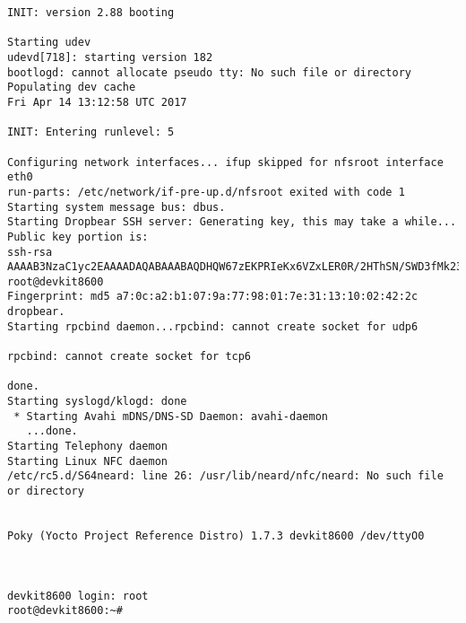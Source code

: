 \documentclass[a4paper,12pt]{report}
\begin{document}
\begin{lstlisting}[caption=Messages de sortie du terminal entre l'allumage de la cible et le prompt de login, label=message_sortie]
INIT: version 2.88 booting

Starting udev
udevd[718]: starting version 182
bootlogd: cannot allocate pseudo tty: No such file or directory
Populating dev cache
Fri Apr 14 13:12:58 UTC 2017

INIT: Entering runlevel: 5

Configuring network interfaces... ifup skipped for nfsroot interface eth0
run-parts: /etc/network/if-pre-up.d/nfsroot exited with code 1
Starting system message bus: dbus.
Starting Dropbear SSH server: Generating key, this may take a while...
Public key portion is:
ssh-rsa AAAAB3NzaC1yc2EAAAADAQABAAABAQDHQW67zEKPRIeKx6VZxLER0R/2HThSN/SWD3fMk23eXy9j3PudyVMJfjGBF258qnZNicoMsK0Mx5JrpV124XKCzvKTAYsMjLc67WdqcX73zSzt1Cplk99ATrT3SKK+Dq16Nld2ZuhfGDidLPvrSqOfRaUYRH6048XV/E7penoQ8oP2tJV0kiGnXRQMoqSyLyZFWW/0xNzatB/Wr6o+I7Iboc2KWDyOu8caJxP4fxrV/4zEjyTvSQCBCzwuv2RSFPJV7lleMD2XkKN+QOGCgG1Eq8TgrNDU0Jps+RelENrtkj+lgVJF2odabmPMtmsB+8lhtgdgk8wth0dbjQzedRFt root@devkit8600
Fingerprint: md5 a7:0c:a2:b1:07:9a:77:98:01:7e:31:13:10:02:42:2c
dropbear.
Starting rpcbind daemon...rpcbind: cannot create socket for udp6

rpcbind: cannot create socket for tcp6

done.
Starting syslogd/klogd: done
 * Starting Avahi mDNS/DNS-SD Daemon: avahi-daemon
   ...done.
Starting Telephony daemon
Starting Linux NFC daemon
/etc/rc5.d/S64neard: line 26: /usr/lib/neard/nfc/neard: No such file or directory


Poky (Yocto Project Reference Distro) 1.7.3 devkit8600 /dev/ttyO0



devkit8600 login: root
root@devkit8600:~# 
\end{lstlisting}
\end{document}
